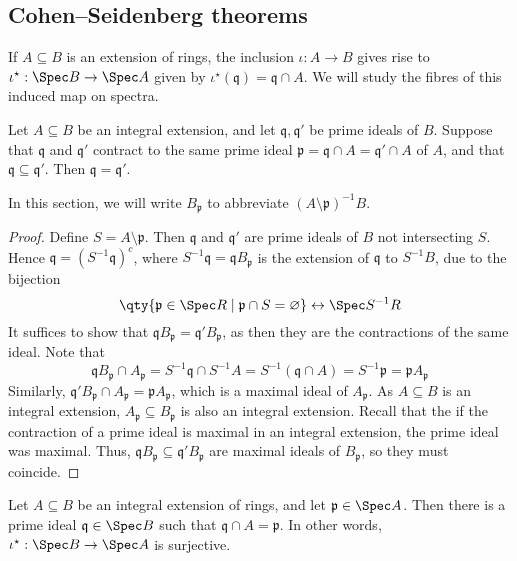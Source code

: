 \subsection{Cohen--Seidenberg theorems}
If \( A \subseteq B \) is an extension of rings, the inclusion \( \iota : A \to B \) gives rise to \( \iota^\star : \Spec B \to \Spec A \) given by \( \iota^\star(\mathfrak q) = \mathfrak q \cap A \).
We will study the fibres of this induced map on spectra.
\begin{proposition}[incomparability]
    Let \( A \subseteq B \) be an integral extension, and let \( \mathfrak q, \mathfrak q' \) be prime ideals of \( B \).
    Suppose that \( \mathfrak q \) and \( \mathfrak q' \) contract to the same prime ideal \( \mathfrak p = \mathfrak q \cap A = \mathfrak q' \cap A \) of \( A \), and that \( \mathfrak q \subseteq \mathfrak q' \).
    Then \( \mathfrak q = \mathfrak q' \).
\end{proposition}
In this section, we will write \( B_{\mathfrak p} \) to abbreviate \( (A \setminus \mathfrak p)^{-1} B \).
\begin{proof}
    Define \( S = A \setminus \mathfrak p \).
    Then \( \mathfrak q \) and \( \mathfrak q' \) are prime ideals of \( B \) not intersecting \( S \).
    Hence \( \mathfrak q = (S^{-1} \mathfrak q)^c \), where \( S^{-1} \mathfrak q = \mathfrak q B_{\mathfrak p} \) is the extension of \( \mathfrak q \) to \( S^{-1} B \), due to the bijection
    \[ \qty{\mathfrak p \in \Spec R \mid \mathfrak p \cap S = \varnothing} \leftrightarrow \Spec S^{-1}R \]
    It suffices to show that \( \mathfrak q B_{\mathfrak p} = \mathfrak q' B_{\mathfrak p} \), as then they are the contractions of the same ideal.
    Note that
    \[ \mathfrak q B_{\mathfrak p} \cap A_{\mathfrak p} = S^{-1} \mathfrak q \cap S^{-1} A = S^{-1} (\mathfrak q \cap A) = S^{-1} \mathfrak p = \mathfrak p A_{\mathfrak p} \]
    Similarly, \( \mathfrak q' B_{\mathfrak p} \cap A_{\mathfrak p} = \mathfrak p A_{\mathfrak p} \), which is a maximal ideal of \( A_{\mathfrak p} \).
    As \( A \subseteq B \) is an integral extension, \( A_{\mathfrak p} \subseteq B_{\mathfrak p} \) is also an integral extension.
    Recall that the if the contraction of a prime ideal is maximal in an integral extension, the prime ideal was maximal.
    Thus, \( \mathfrak q B_{\mathfrak p} \subseteq \mathfrak q' B_{\mathfrak p} \) are maximal ideals of \( B_{\mathfrak p} \), so they must coincide.
\end{proof}
\begin{proposition}
    Let \( A \subseteq B \) be an integral extension of rings, and let \( \mathfrak p \in \Spec A \).
    Then there is a prime ideal \( \mathfrak q \in \Spec B \) such that \( \mathfrak q \cap A = \mathfrak p \).
    In other words, \( \iota^\star : \Spec B \to \Spec A \) is surjective.
\end{proposition}
